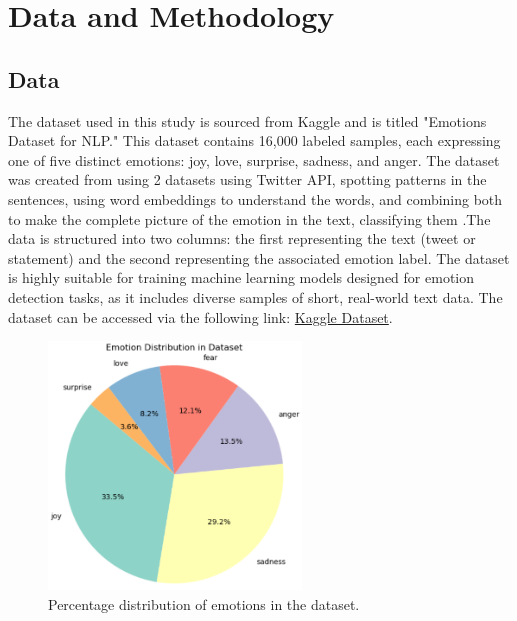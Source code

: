 

\section{Data and Methodology}

\subsection{Data}
The dataset used in this study is sourced from Kaggle and is titled "Emotions Dataset for NLP." This dataset contains 16,000 labeled samples, each expressing one of five distinct emotions: joy, love, surprise, sadness, and anger. The dataset was created from using 2 datasets using Twitter API, spotting patterns in the sentences, using word embeddings to understand the words, and combining both to make the complete picture of the emotion in the text, classifying them \cite{Saravia2018}.The data is structured into two columns: the first representing the text (tweet or statement) and the second representing the associated emotion label. The dataset is highly suitable for training machine learning models designed for emotion detection tasks, as it includes diverse samples of short, real-world text data. The dataset can be accessed via the following link: \href{https://www.kaggle.com/datasets/praveengovi/emotions-dataset-for-nlp/data}{\color{blue}Kaggle Dataset}.

\begin{figure}[H]
    \centering
    \includegraphics[width=0.6\textwidth]{images/emotion_pie.png}
    \caption{Percentage distribution of emotions in the dataset.}
    \label{fig:emotion_pie}
\end{figure}


